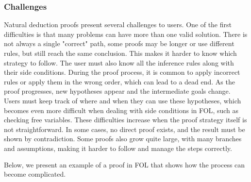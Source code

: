 \subsubsection*{Challenges}
Natural deduction proofs present several challenges to users. One of the first difficulties is that many problems can have more than one valid solution. There is not always a single "correct" path, some proofs may be longer or use different rules, but still reach the same conclusion. This makes it harder to know which strategy to follow. The user must also know all the inference rules along with their side conditions. During the proof process, it is common to apply incorrect rules or apply them in the wrong order, which can lead to a dead end. As the proof progresses, new hypotheses appear and the intermediate goals change. Users must keep track of where and when they can use these hypotheses, which becomes even more difficult when dealing with side conditions in \gls{FOL}, such as checking free variables. These difficulties increase when the proof strategy itself is not straightforward. In some cases, no direct proof exists, and the result must be shown by contradiction. Some proofs also grow quite large, with many branches and assumptions, making it harder to follow and manage the steps correctly.

Below, we present an example of a proof in \gls{FOL} that shows how the process can become complicated.


\begin{prooftree}
  

  
  
  





\end{prooftree}

